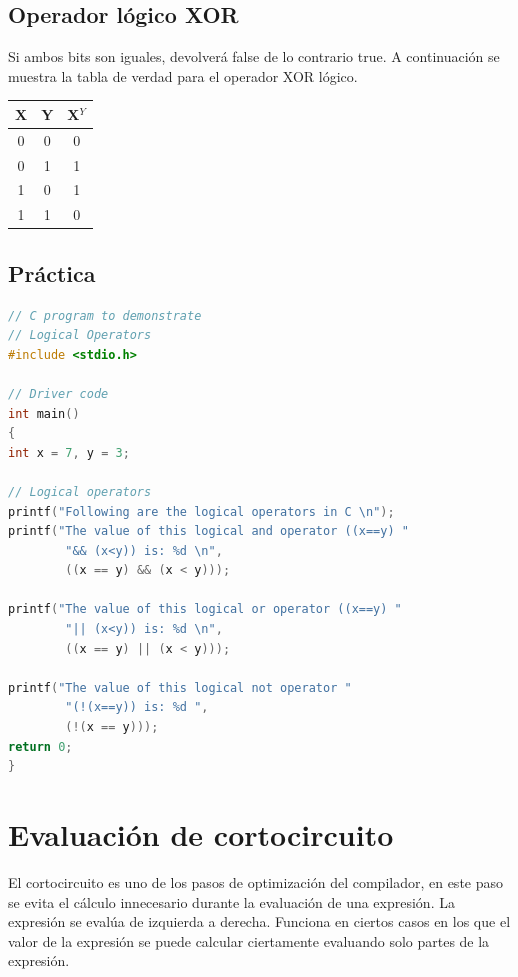 \documentclass{article}
\begin{document}
\subsection{Operador lógico XOR}
Si ambos bits son iguales, devolverá false de lo contrario true. A continuación se muestra la tabla de verdad para el operador XOR lógico.\\

\begin{tabular}{|c|c|c|}
\hline
X & Y & X$^Y$ \\
\hline
0 & 0 & 0 \\
0 & 1 & 1 \\
1 & 0 & 1 \\
1 & 1 & 0 \\
\hline
\end{tabular}
\subsection{Práctica}
\begin{lstlisting}[style=mystyle, language=C]
// C program to demonstrate
// Logical Operators
#include <stdio.h>

// Driver code
int main()
{
int x = 7, y = 3;

// Logical operators
printf("Following are the logical operators in C \n");
printf("The value of this logical and operator ((x==y) "
		"&& (x<y)) is: %d \n",
		((x == y) && (x < y)));

printf("The value of this logical or operator ((x==y) "
		"|| (x<y)) is: %d \n",
		((x == y) || (x < y)));

printf("The value of this logical not operator "
		"(!(x==y)) is: %d ",
		(!(x == y)));
return 0;
}
\end{lstlisting}

\section{Evaluación de cortocircuito}
El cortocircuito es uno de los pasos de optimización del compilador, en este paso se evita el cálculo innecesario durante la evaluación de una expresión. La expresión se evalúa de izquierda a derecha. Funciona en ciertos casos en los que el valor de la expresión se puede calcular ciertamente evaluando solo partes de la expresión.\\
\end{document}
